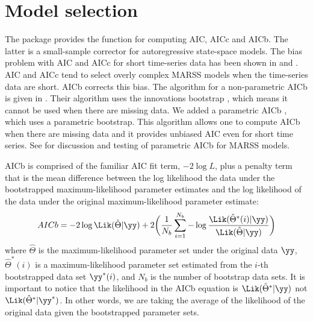 \section{Model selection}
The package provides the \verb@MARSSaic@{} function for computing AIC, AICc and AICb.  The latter is a small-sample corrector for autoregressive state-space models.  The bias problem with AIC and AICc for short time-series data has been shown in \citet{CavanaughShumway1997} and \citet{HolmesWard2010}.  AIC and AICc tend to select overly complex MARSS models when the time-series data are short.  AICb corrects this bias.  The algorithm for a non-parametric AICb is given in \citet{CavanaughShumway1997}.  Their algorithm uses the innovations bootstrap \citep{StofferWall1991}, which means it cannot be used when there are missing data.  We added a parametric AICb \citep{HolmesWard2010}, which uses a parametric bootstrap. This algorithm allows one to compute AICb when there are missing data and it provides unbiased AIC even for short time series.  See \citet{HolmesWard2010} for discussion and testing of parametric AICb for MARSS models. 

AICb is comprised of the familiar AIC fit term, $-2 \log L$, plus a penalty term that is the mean difference between the log likelihood the data under the bootstrapped maximum-likelihood parameter estimates and the log likelihood of the data under the original maximum-likelihood parameter estimate:
\begin{equation}
	AICb = -2 \log \Lik(\hat{\Theta} | \yy) + 2 \bigg( \frac{1}{N_b}\sum_{i=1}^{N_b} -\log \frac{\Lik(\hat{\Theta}^*(i) | \yy)}{\Lik(\hat{\Theta} | \yy)}\bigg)
\label{eq:AICb}
\end{equation}
where $\hat{\Theta}$ is the maximum-likelihood parameter set under the original data $\yy$, $\hat{\Theta}^*(i)$ is a maximum-likelihood parameter set estimated from the $i$-th bootstrapped data set $\yy^*(i)$, and $N_b$ is the number of bootstrap data sets.  It is important to notice that the likelihood in the AICb equation is $\Lik(\hat{\Theta}^* | \yy)$ not $\Lik(\hat{\Theta}^* | \yy^*)$.  In other words, we are taking the average of the likelihood of the original data given the bootstrapped parameter sets. 
